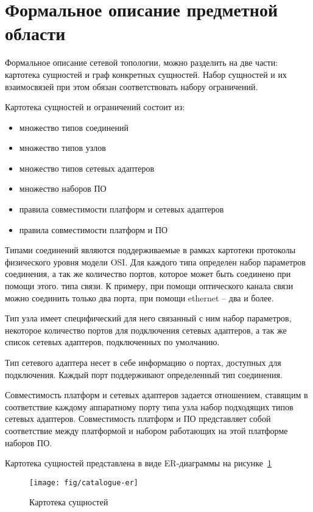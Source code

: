 \section{Формальное описание предметной области}

Формальное описание сетевой топологии, можно разделить на две части:
картотека сущностей и граф конкретных сущностей. 
Набор сущностей и их взаимосвязей при этом обязан соответствовать набору ограничений.

Картотека сущностей и ограничений состоит из:
\begin{itemize}
    \item множество типов соединений
    \item множество типов узлов
    \item множество типов сетевых адаптеров
    \item множество наборов ПО
    \item правила совместимости платформ и сетевых адаптеров
    \item правила совместимости платформ и ПО
\end{itemize}

Типами соединений являются поддерживаемые в рамках картотеки
протоколы физического уровня модели OSI. Для каждого типа определен набор параметров
соединения, а так же количество портов, которое может быть соединено при помощи этого.
типа связи. К примеру, при помощи оптического канала связи можно соединить только два порта,
при помощи ethernet -- два и более. 

Тип узла имеет специфический для него связанный с ним набор параметров,
некоторое количество портов для подключения сетевых адаптеров, 
а так же список сетевых адаптеров, подключенных по умолчанию.

Тип сетевого адаптера несет в себе информацию о портах, доступных для подключения. 
Каждый порт поддерживают определенный тип соединения.

Совместимость платформ и сетевых адаптеров задается отношением, ставящим в соответствие 
каждому аппаратному порту типа узла набор подходящих типов сетевых адаптеров.
Совместимость платформ и ПО представляет собой соответствие между платформой и набором
работающих на этой платформе наборов ПО.

Картотека сущностей представлена в виде ER-диаграммы на рисунке~\ref{fig:catalogue-er}
\begin{figure}
  \centering
  {\texttt{[image: fig/catalogue-er]}}
  \caption{Картотека сущностей}
  \label{fig:catalogue-er}
\end{figure} 


